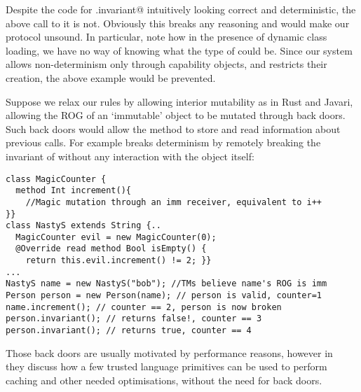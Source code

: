 Despite the code for \Q@Person.invariant@ intuitively looking correct and deterministic, the above call to it is not. Obviously this breaks any reasoning and would make our protocol unsound. 
In particular, note how in the presence of dynamic class loading, we have no way of knowing what the type of \Q@name@ could be. Since our system allows non-determinism only through capability objects, and 
restricts their creation, the above example would be prevented.

Suppose we relax our rules by allowing interior mutability
as in Rust and Javari, allowing the ROG of an `immutable' object to be mutated through back doors.
Such back doors would allow the \Q@invariant@ method to store and read information about previous calls.
For example \Q@MagicCounter@ breaks determinism by
remotely breaking the invariant of \Q@person@ without any interaction with the \Q@person@ object itself:
\begin{lstlisting}
class MagicCounter {
  method Int increment(){
    //Magic mutation through an imm receiver, equivalent to i++
}}
class NastyS extends String {..
  MagicCounter evil = new MagicCounter(0);
  @Override read method Bool isEmpty() {
    return this.evil.increment() != 2; }}
...
NastyS name = new NastyS("bob"); //TMs believe name's ROG is imm
Person person = new Person(name); // person is valid, counter=1
name.increment(); // counter == 2, person is now broken
person.invariant(); // returns false!, counter == 3
person.invariant(); // returns true, counter == 4
\end{lstlisting}
Those back doors are usually motivated by performance reasons, however in~\cite{GordonEtAl12} they
discuss how a few trusted language primitives can be used to perform caching and other needed optimisations,
without the need for back doors.


